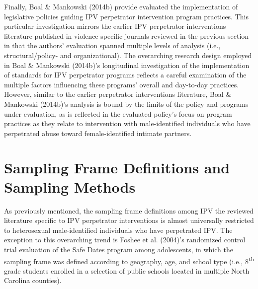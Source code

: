 \documentclass[11pt,]{tufte-book}
\begin{document}
Finally, Boal \& Mankowski (2014b) provide evaluated the implementation
of legislative policies guiding IPV perpetrator intervention program
practices. This particular investigation mirrors the earlier IPV
perpetrator interventions literature published in violence-specific
journals reviewed in the previous section in that the authors'
evaluation spanned multiple levels of analysis (i.e., structural/policy-
and organizational). The overarching research design employed in Boal \&
Mankowski (2014b)'s longitudinal investigation of the implementation of
standards for IPV perpetrator programs reflects a careful examination of
the multiple factors influencing these programs' overall and day-to-day
practices. However, similar to the earlier perpetrator interventions
literature, Boal \& Mankowski (2014b)'s analysis is bound by the limits
of the policy and programs under evaluation, as is reflected in the
evaluated policy's focus on program practices as they relate to
intervention with male-identified individuals who have perpetrated abuse
toward female-identified intimate partners.

\section{Sampling Frame Definitions and Sampling
Methods}\label{sampling-frame-definitions-and-sampling-methods}

As previously mentioned, the sampling frame definitions among IPV the
reviewed literature specific to IPV perpetrator interventions is almost
universally restricted to heterosexual male-identified individuals who
have perpetrated IPV. The exception to this overarching trend is Foshee
et al. (2004)'s randomized control trial evaluation of the Safe Dates
program among adolescents, in which the sampling frame was defined
according to geography, age, and school type (i.e.,
8\textsuperscript{th} grade students enrolled in a selection of public
schools located in multiple North Carolina counties).
\end{document}
